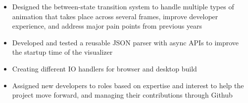 
\begin{itemize}
  \item Designed the between-state transition system to handle multiple
  types of animation that takes place across several frames,
  improve developer experience, and address major
  pain points from previous years
  \item Developed and tested a reusable JSON parser with async APIs
  to improve the startup time of the visualizer
  \item Creating different IO handlers for browser and desktop build
  \item Assigned new developers to roles based on expertise and interest
  to help the project move forward, and managing their contributions through
  Github
\end{itemize}
